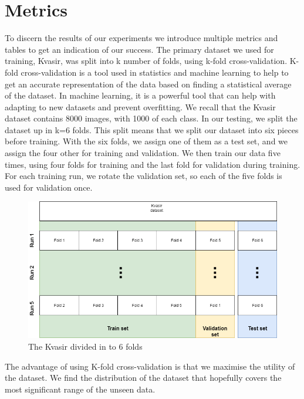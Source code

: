 \section{Metrics}
To discern the results of our experiments we introduce multiple metrics and tables to get an indication of our success. The primary dataset we used for training, Kvasir, was split into k number of folds, using k-fold cross-validation.  K-fold cross-validation is a tool used in statistics and machine learning to help to get an accurate representation of the data based on finding a statistical average of the dataset.  In machine learning, it is a powerful tool that can help with adapting to new datasets and prevent overfitting.  We recall that the Kvasir dataset contains 8000 images, with 1000 of each class.
In our testing, we split the dataset up in k=6 folds. This split means that we split our dataset into six pieces before training.  With the six folds, we assign one of them as a test set, and we assign the four other for training and validation. We then train our data five times, using four folds for training and the last fold for validation during training. For each training run, we rotate the validation set, so each of the five folds is used for validation once.


\begin{figure}[h]
\hspace*{-1cm}                                                           
\centering
\includegraphics[scale=0.4]{experiments/figures/KfoldKvasir_compressed.png}
\caption{The Kvasir divided in to 6 folds}
\label{fig:KfoldKvasir}
\end{figure}

The advantage of using K-fold cross-validation is that we maximise the utility of the dataset. We find the distribution of the dataset that hopefully covers the most significant range of the unseen data. 

